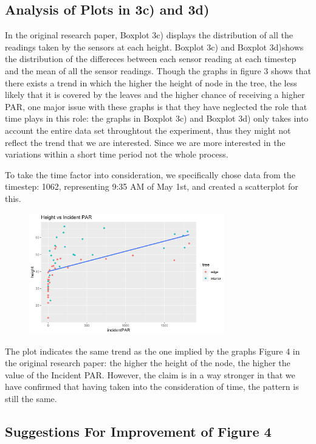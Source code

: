 \documentclass[twocolumn,11pt]{asme2ej}
\begin{document}
\subsection{Analysis of Plots in 3c) and 3d)}

In the original research paper, Boxplot 3c) displays the distribution of all the readings taken by the sensors at each height. Boxplot 3c) and Boxplot 3d)shows the distribution of the differeces between each sensor reading at each timestep and the mean of all the sensor readings. Though the graphs in figure 3 shows that there exists a trend in which the higher the height of node in the tree, the less likely that it is covered by the leaves and the higher chance of receiving a higher PAR, one major issue with these graphs is that they have neglected the role that time plays in this role: the graphs in Boxplot 3c) and Boxplot 3d) only takes into account the entire data set throughtout the experiment, thus they might not reflect the trend that we are interested. Since we are more interested in the variations within a short time period not the whole process.

To take the time factor into consideration, we specifically chose data from the timestep: 1062, representing 9:35 AM of May 1st, and created a scatterplot for this. 

\begin{figure}
    \centering
    \includegraphics[width=85mm]{5b.png} 
    \caption{}
    \label{fig:5b}
\end{figure}

The plot indicates the same trend as the one implied by the graphs Figure 4 in the original research paper: the higher the height of the node, the higher the value of the Incident PAR. However, the claim is in a way stronger in that we have confirmed that having taken into the consideration of time, the pattern is still the same. 

\subsection{Suggestions For Improvement of Figure 4}
\end{document}
